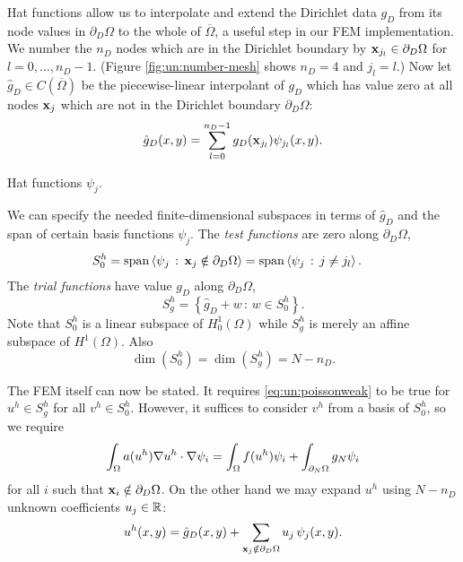 Hat functions allow us to interpolate and extend the Dirichlet data $g_D$ from its node values in $\partial_D \Omega$ to the whole of $\overline\Omega$, a useful step in our FEM implementation.  We number the $n_D$ nodes which are in the Dirichlet boundary by $\mathbf{x}_{j_l} \in \partial_D\Omega$ for $l=0,\dots,n_D-1$.  (Figure \ref{fig:un:number-mesh} shows $n_D=4$ and $j_l=l$.)  Now let $\hat g_D \in C(\overline\Omega)$ be the piecewise-linear interpolant of $g_D$ which has value zero at all nodes $\mathbf{x}_j$ which are not in the Dirichlet boundary $\partial_D \Omega$:
\begin{equation}
\hat g_D(x,y) = \sum_{l=0}^{n_D-1} g_D(\mathbf{x}_{j_l}) \psi_{j_l}(x,y). \label{eq:un:hatgdefine}
\end{equation}

\begin{marginfigure}

\caption{Hat functions $\psi_j$.}
\label{fig:un:hatfunction}
\end{marginfigure}

We can specify the needed finite-dimensional subspaces in terms of $\hat g_D$ and the span of certain basis functions $\psi_j$.  The \emph{test functions} are zero along $\partial_D \Omega$,
\begin{align*}
S_{0}^h &= \operatorname{span}\left<\psi_j \,:\, \mathbf{x}_j \notin \partial_D \Omega\right> = \operatorname{span}\left<\psi_j \,:\, j \neq j_l\right>.
\end{align*}
The \emph{trial functions} have value $g_D$ along $\partial_D \Omega$,
\begin{equation}
S_{g}^h = \left\{\hat g_D + w \,:\, w \in S_{0}^h\right\}.
\end{equation}
Note that $S_{0}^h$ is a linear subspace of $H_{0}^1(\Omega)$ while $S_{g}^h$ is merely an affine subspace of $H^1(\Omega)$.  Also
\begin{equation}
\dim(S_{0}^h)=\dim(S_{g}^h)=N-n_D.
\end{equation}

The FEM itself can now be stated.  It requires \eqref{eq:un:poissonweak} to be true for $u^h\in S_{g}^h$ for all $v^h\in S_{0}^h$.  However, it suffices to consider $v^h$ from a basis of $S_{0}^h$, so we require
\begin{equation}
\int_\Omega a(u^h) \nabla u^h \cdot \nabla \psi_i = \int_\Omega f(u^h) \psi_i + \int_{\partial_N\Omega} g_N \psi_i \label{eq:un:weakformhat}
\end{equation}
for all $i$ such that $\mathbf{x}_i \notin \partial_D \Omega$.  On the other hand we may expand $u^h$ using $N-n_D$ unknown coefficients $u_j\in\mathbb{R}$:
\begin{equation}
u^h(x,y) = \hat g_D(x,y) + \sum_{\mathbf{x}_j \notin \partial_D \Omega} u_j\, \psi_j(x,y). \label{eq:un:uhexpand}
\end{equation}

